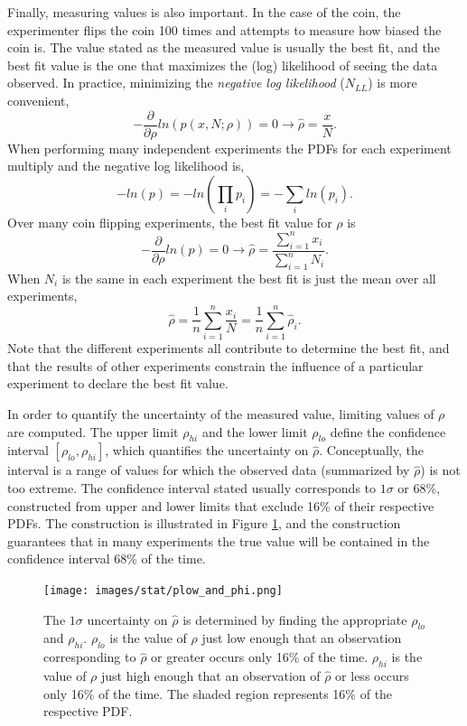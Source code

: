 Finally, measuring values is also important. In the case of the coin, the experimenter flips the coin 100 times and attempts to measure how biased the coin is. The value stated as the measured value is usually the best fit, and the best fit value is the one that maximizes the (log) likelihood of seeing the data observed. In practice, minimizing the \textit{negative log likelihood} ($N_{LL}$) is more convenient, 
\begin{equation}
-\frac{\partial}{\partial \rho}ln\left(p(x,N;\rho)\right) = 0 \rightarrow \hat{\rho} = \frac{x}{N}.
\end{equation}   
When performing many independent experiments the PDFs for each experiment multiply and the negative log likelihood is,
\begin{equation}
-ln(p) = -ln\left(\prod_i p_i\right) = -\sum_i ln\left(p_i\right).
\end{equation}
Over many coin flipping experiments, the best fit value for $\rho$ is
\begin{equation}
-\frac{\partial}{\partial \rho}ln(p) = 0 \rightarrow \hat{\rho} = \frac{\sum_{i=1}^{n} x_i}{\sum_{i=1}^{n} N_i}.
\end{equation}
When $N_i$ is the same in each experiment the best fit is just the mean over all experiments,
\begin{equation}
\hat{\rho} = \frac{1}{n} \sum_{i=1}^{n} \frac{x_i}{N} = \frac{1}{n} \sum_{i=1}^{n} \hat{\rho}_i.
\end{equation}
Note that the different experiments all contribute to determine the best fit, and that the results of other experiments constrain the influence of a particular experiment to declare the best fit value.  

In order to quantify the uncertainty of the measured value, limiting values of $\rho$ are computed. The upper limit $\rho_{hi}$ and the lower limit $\rho_{lo}$ define the confidence interval $[\rho_{lo}, \rho_{hi}]$, which quantifies the uncertainty on $\hat{\rho}$. Conceptually, the interval is a range of values for which the observed data (summarized by $\hat{\rho}$) is not too extreme. The confidence interval stated usually corresponds to $1\sigma$ or 68\%, constructed from upper and lower limits that exclude 16\% of their respective PDFs. The construction is illustrated in Figure \ref{fig:meas_uncertainty}, and the construction guarantees that in many experiments the true value will be contained in the confidence interval 68\% of the time.    

\begin{figure}[h!]
  \centering
  \texttt{[image: images/stat/plow\_and\_phi.png]}
  \caption[Defining the confidence interval.]
   {The $1\sigma$ uncertainty on $\hat{\rho}$ is determined by finding the appropriate $\rho_{lo}$ and $\rho_{hi}$. $\rho_{lo}$ is the value of $\rho$ just low enough that an observation corresponding to $\hat{\rho}$ or greater occurs only 16\% of the time. $\rho_{hi}$ is the value of $\rho$ just high enough that an observation of $\hat{\rho}$ or less occurs only 16\% of the time. The shaded region represents 16\% of the respective PDF.}
\label{fig:meas_uncertainty}
\end{figure}

